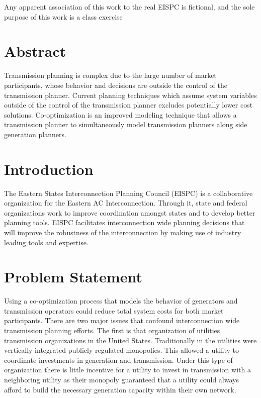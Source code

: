 \documentclass[oneside,12pt]{report}
\def\prefacesection#1{
\chapter*{#1}
\addcontentsline{toc}{chapter}{#1}
}
\begin{document}
\vfill  %
\footnoterule
\noindent \small{Any apparent association of this work to  the real EISPC is fictional, and the sole purpose of this work is a class exercise}

\prefacesection{Abstract}
Transmission planning is complex due to the large number of market participants, whose behavior and decisions are outside the control of the transmission planner. Current planning techniques which assume system variables outside of the control of the transmission planner excludes potentially lower cost solutions. Co-optimization is an improved modeling technique that allows a transmission planner to simultaneously model transmission planners along side generation planners.


\tableofcontents

\listoffigures




\renewcommand{\thefootnote}{\arabic{footnote}}
\setcounter{footnote}{0}


\chapter{Introduction}
The Eastern States Interconnection Planning Council (EISPC) is a collaborative organization for the Eastern AC Interconnection. Through it, state and federal organizations work to improve coordination  amongst states and to develop better planning tools. EISPC facilitates interconnection wide planning decisions that will improve the robustness of the interconnection by making use of industry leading tools and expertise. 

\chapter{Problem Statement}
Using a co-optimization process that models the behavior of generators and transmission operators could reduce total system costs for both market participants.
There are two major issues that confound interconnection wide transmission planning efforts. The first is that organization of utilities transmission organizations in the United States. Traditionally in the utilities were vertically integrated publicly regulated monopolies. This allowed a utility to coordinate investments in generation and transmission. Under this type of organization there is little incentive for a utility to invest in transmission with a neighboring utility as their monopoly guaranteed that a utility could always afford to build the necessary generation capacity within their own network.
\end{document}
